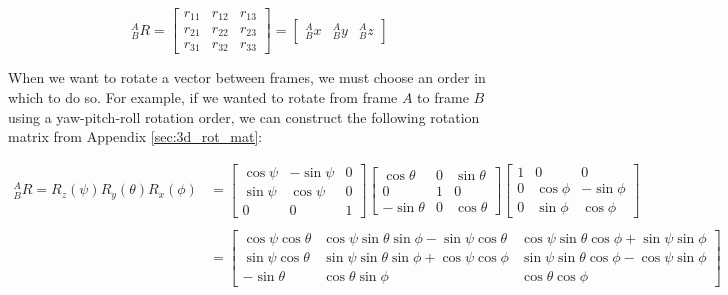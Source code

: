 \begin{equation*}
    {}^A_B R = \left[
        \begin{matrix}
            r_{11} & r_{12} & r_{13} \\
            r_{21} & r_{22} & r_{23} \\
            r_{31} & r_{32} & r_{33}
        \end{matrix}
    \right] = \left[
        \begin{matrix}
            {}^A_Bx & {}^A_By & {}^A_Bz
        \end{matrix}\right]
\end{equation*}

When we want to rotate a vector between frames, we must choose an order in which to do so.
For example, if we wanted to rotate from frame $A$ to frame $B$ using a yaw-pitch-roll rotation order, we can construct the following rotation matrix from Appendix \ref{sec:3d_rot_mat}:

\begin{align*}
    {}^A_B R = R_z(\psi) R_y(\theta) R_x(\phi) &= \left[
        \begin{matrix}
            \cos\psi & -\sin\psi & 0 \\
            \sin\psi & \cos\psi & 0 \\
            0 & 0 & 1
        \end{matrix}\right]
        \left[\begin{matrix}
            \cos\theta & 0 & \sin\theta \\
            0 & 1 & 0 \\
            -\sin\theta & 0 & \cos\theta
        \end{matrix}\right]
        \left[\begin{matrix}
            1 & 0 & 0 \\
            0 & \cos\phi & -\sin\phi \\
            0 & \sin\phi & \cos\phi 
        \end{matrix}\right] \\ \\
        &= \left[\begin{matrix}
            \cos\psi\cos\theta & \cos\psi\sin\theta\sin\phi-\sin\psi\cos\theta & \cos\psi\sin\theta\cos\phi+\sin\psi\sin\phi \\
            \sin\psi\cos\theta & \sin\psi\sin\theta\sin\phi+\cos\psi\cos\phi & \sin\psi\sin\theta\cos\phi-\cos\psi\sin\phi \\
            -\sin\theta & \cos\theta\sin\phi & \cos\theta\cos\phi
        \end{matrix}\right]
\end{align*}

